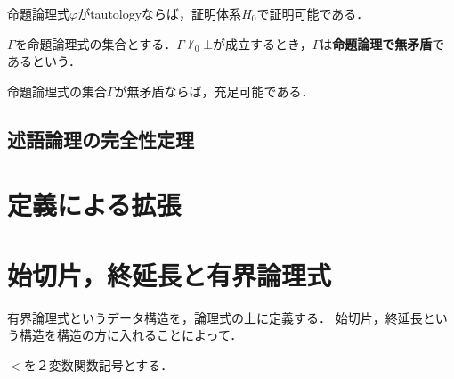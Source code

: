 \documentclass[uplatex, dvipdfmx]{jsreport}
\begin{document}
\begin{theorem}
    命題論理式$\varphi$がtautologyならば，証明体系$H_0$で証明可能である．
\end{theorem}

\begin{definition}[consistent]
    $\Gamma$を命題論理式の集合とする．$\Gamma\nvdash_0\bot$が成立するとき，$\Gamma$は\textbf{命題論理で無矛盾}であるという．
\end{definition}

\begin{corollary}
    命題論理式の集合$\Gamma$が無矛盾ならば，充足可能である．
\end{corollary}

\subsection{述語論理の完全性定理}

\section{定義による拡張}\label{section-保存拡大}

\section{始切片，終延長と有界論理式}

有界論理式というデータ構造を，論理式の上に定義する．
始切片，終延長という構造を構造の方に入れることによって．

\begin{notation}
    $<$を２変数関数記号とする．
\end{notation}
\end{document}
